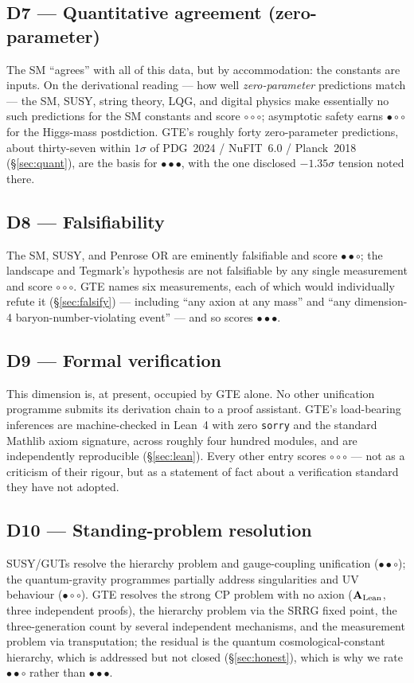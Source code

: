 \documentclass[11pt]{article}
\newcommand{\CatAL}{\ensuremath{\textbf{A}_{\rm Lean}}}
\newcommand{\rFull}{\ensuremath{\bullet\bullet\bullet}}      %
\newcommand{\rStrong}{\ensuremath{\bullet\bullet\circ}}      %
\newcommand{\rPart}{\ensuremath{\bullet\circ\circ}}          %
\newcommand{\rNone}{\ensuremath{\circ\circ\circ}}            %
\begin{document}
\subsection*{D7 --- Quantitative agreement (zero-parameter)}
The SM ``agrees'' with all of this data, but by accommodation: the constants are
inputs.  On the derivational reading --- how well \emph{zero-parameter} predictions
match --- the SM, SUSY, string theory, LQG, and digital physics make essentially no
such predictions for the SM constants and score \rNone{}; asymptotic safety earns
\rPart{} for the Higgs-mass postdiction.  GTE's roughly forty zero-parameter
predictions, about thirty-seven within $1\sigma$ of PDG~2024 / NuFIT~6.0 /
Planck~2018 (§\ref{sec:quant}), are the basis for \rFull{}, with the one disclosed
$-1.35\sigma$ tension noted there.

\subsection*{D8 --- Falsifiability}
The SM, SUSY, and Penrose OR are eminently falsifiable and score \rStrong{}; the
landscape and Tegmark's hypothesis are not falsifiable by any single measurement
and score \rNone{}.  GTE names six measurements, each of which would individually
refute it (§\ref{sec:falsify}) --- including ``any axion at any mass'' and ``any
dimension-4 baryon-number-violating event'' --- and so scores \rFull{}.

\subsection*{D9 --- Formal verification}
This dimension is, at present, occupied by GTE alone.  No other unification
programme submits its derivation chain to a proof assistant.  GTE's load-bearing
inferences are machine-checked in Lean~4 with zero \texttt{sorry} and the standard
Mathlib axiom signature, across roughly four hundred modules, and are
independently reproducible (§\ref{sec:lean}).  Every other entry scores \rNone{} ---
not as a criticism of their rigour, but as a statement of fact about a verification
standard they have not adopted.

\subsection*{D10 --- Standing-problem resolution}
SUSY/GUTs resolve the hierarchy problem and gauge-coupling unification (\rStrong);
the quantum-gravity programmes partially address singularities and UV behaviour
(\rPart).  GTE resolves the strong CP problem with no axion (\CatAL, three
independent proofs), the hierarchy problem via the SRRG fixed point, the
three-generation count by several independent mechanisms, and the measurement
problem via transputation; the residual is the quantum cosmological-constant
hierarchy, which is addressed but not closed (§\ref{sec:honest}), which is why we
rate \rStrong{} rather than \rFull{}.
\end{document}
